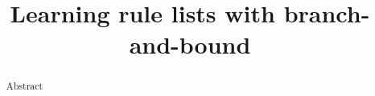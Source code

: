 \documentclass[aoas,preprint]{imsart}
\begin{document}
\begin{frontmatter}

\title{Learning rule lists with branch-and-bound}


\begin{abstract}
Abstract
\end{abstract}

\end{frontmatter}

\tableofcontents


\end{document}
